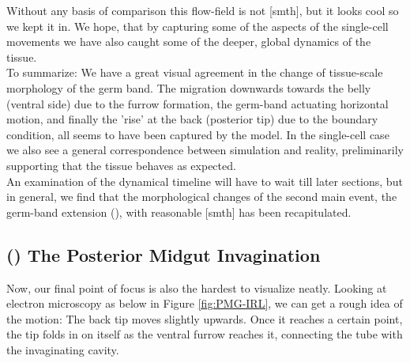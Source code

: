 Without any basis of comparison this flow-field is not [smth], but it looks cool so we kept it in.
We hope, that by capturing some of the aspects of the single-cell movements we have also caught some of the deeper, global dynamics of the tissue.\\

To summarize: We have a great visual agreement in the change of tissue-scale morphology of the germ band. The migration downwards towards the belly (ventral side) due to the furrow formation, the germ-band actuating horizontal motion, and finally the 'rise' at the back (posterior tip) due to the boundary condition, all seems to have been captured by the model. In the single-cell case we also see a general correspondence between simulation and reality, preliminarily supporting that the tissue behaves as expected.\\  


An examination of the dynamical timeline will have to wait till later sections, but in general, we find that the morphological changes of the second main event, the germ-band extension (), with reasonable [smth] has been recapitulated.


\subsection{() The Posterior Midgut Invagination }
Now, our final point of focus is also the hardest to visualize neatly. Looking at electron microscopy as below in Figure \ref{fig:PMG-IRL}, we can get a rough idea of the motion:
The back tip moves slightly upwards. Once it reaches a certain point, the tip folds in on itself as the ventral furrow reaches it, connecting the tube with the invaginating cavity.\cite{campos2013embryonic}

